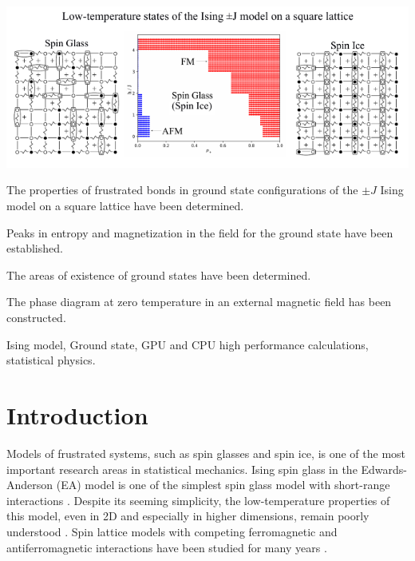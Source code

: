 \documentclass[preprint,12pt]{elsarticle}
\begin{document}
\begin{frontmatter}
\begin{abstract}
		\end{abstract}
		
		\begin{graphicalabstract}
		\includegraphics[width=1.2\linewidth]{Graphical Abstract.pdf}
		\end{graphicalabstract}
		
		
		\begin{highlights}
			\item The properties of frustrated bonds in ground state configurations of the $\pm J$ Ising model on a square lattice have been determined.  
			\item Peaks in entropy and magnetization in the field for the ground state have been established.  
			\item The areas of existence of ground states have been determined.  
			\item The phase diagram at zero temperature in an external magnetic field has been constructed.
		\end{highlights}  
		
		
		\begin{keyword}
			Ising model, Ground state, GPU and CPU high performance calculations, statistical physics.
		\end{keyword}
		
	\end{frontmatter}
	
	\linenumbers
	
	\tableofcontents
	
	\newpage
	\section{Introduction}
	
	Models of frustrated systems, such as spin glasses and spin ice, is one of the most important research areas in statistical mechanics. Ising spin glass in the Edwards-Anderson (EA) model is one of the simplest spin glass model with short-range interactions \cite{edwards1975theory}. Despite its seeming simplicity, the low-temperature properties of this model, even in 2D and especially in higher dimensions, remain poorly understood \cite{pal1996ground, hartmann2011ground, newman2022ground}. Spin lattice models with competing ferromagnetic and antiferromagnetic interactions have been studied for many years \cite{binder1986spin, mezard1987spin, lebrecht2004plaquette, valdes2012j, lebrecht2015j, fan2023searching}.
	
\end{document}
